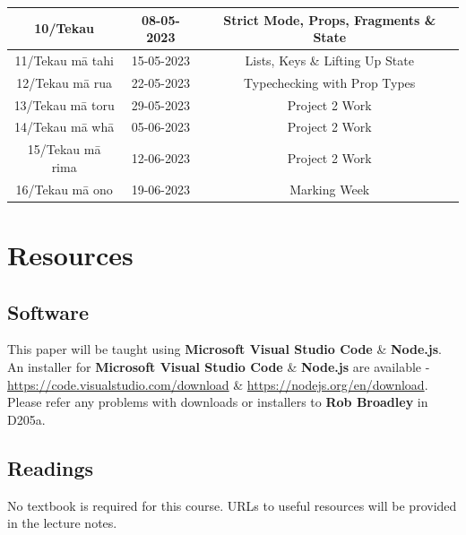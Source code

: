\documentclass{article}
\begin{document}
\begin{tabular}{|c|c|c|c|}
	\footnotesize 10/Tekau         & \footnotesize 08-05-2023 & \multicolumn{2}{c|}{\footnotesize Strict Mode, Props, Fragments \& State}                                                                 \\ \hline
	\footnotesize 11/Tekau mā tahi & \footnotesize 15-05-2023 & \multicolumn{2}{c|}{\footnotesize Lists, Keys \& Lifting Up State}                                                                 \\ \hline
	\footnotesize 12/Tekau mā rua  & \footnotesize 22-05-2023 & \multicolumn{2}{c|}{\footnotesize Typechecking with Prop Types}                                                                 \\ \hline
	\footnotesize 13/Tekau mā toru & \footnotesize 29-05-2023 & \multicolumn{2}{c|}{\footnotesize Project 2 Work}                                                     \\ \hline
	\footnotesize 14/Tekau mā whā  & \footnotesize 05-06-2023 & \multicolumn{2}{c|}{\footnotesize Project 2 Work} \\ \hline 
	\footnotesize 15/Tekau mā rima & \footnotesize 12-06-2023 & \multicolumn{2}{c|}{\footnotesize Project 2 Work}                                                       \\ \hline
	\footnotesize 16/Tekau mā ono  & \footnotesize 19-06-2023 & \multicolumn{2}{c|}{\footnotesize Marking Week}                                                         \\ \hline
\end{tabular}

\section*{Resources}

\subsection*{Software}
This paper will be taught using \textbf{Microsoft Visual Studio Code} \& \textbf{Node.js}. An installer for \textbf{Microsoft Visual Studio Code} \& \textbf{Node.js} are available - \href{https://code.visualstudio.com/download}{https://code.visualstudio.com/download} \& \href{https://nodejs.org/en/download}{https://nodejs.org/en/download}. Please refer any problems with downloads or installers to \textbf{Rob Broadley} in D205a.

\subsection*{Readings}
No textbook is required for this course. URLs to useful resources will be provided in the lecture notes. 
\end{document}
